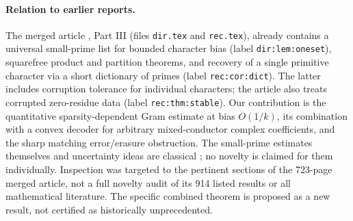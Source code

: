 \documentclass[11pt]{article}
\theoremstyle{remark}\newtheorem{remark}[theorem]{Remark}
\begin{document}
\paragraph{Relation to earlier reports.}
The merged article \cite{article}, Part III (files \texttt{dir.tex} and \texttt{rec.tex}), already contains a universal small-prime list for bounded character bias (label \texttt{dir:lem:oneset}), squarefree product and partition theorems, and recovery of a single primitive character via a short dictionary of primes (label \texttt{rec:cor:dict}). The latter includes corruption tolerance for individual characters; the article also treats corrupted zero-residue data (label \texttt{rec:thm:stable}). Our contribution is the quantitative sparsity-dependent Gram estimate at bias $O(1/k)$, its combination with a convex decoder for arbitrary mixed-conductor complex coefficients, and the sharp matching error/erasure obstruction. The small-prime estimates themselves and uncertainty ideas are classical \cite{mv,tao,ds,jmv}; no novelty is claimed for them individually. Inspection was targeted to the pertinent sections of the 723-page merged article, not a full novelty audit of its 914 listed results or all mathematical literature. The specific combined theorem is proposed as a new result, not certified as historically unprecedented.
\end{document}
